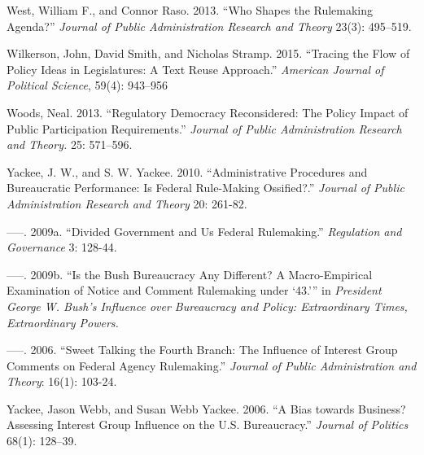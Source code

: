 West, William F., and Connor Raso. 2013. ``Who Shapes the Rulemaking Agenda?'' \textit{Journal of Public Administration Research and Theory} 23(3): 495–519.

Wilkerson, John, David Smith, and Nicholas Stramp. 2015. ``Tracing the Flow of Policy Ideas in Legislatures: A Text Reuse Approach.'' \textit{American Journal of Political Science}, 59(4): 943–956

Woods, Neal. 2013. ``Regulatory Democracy Reconsidered: The Policy Impact of Public Participation Requirements.'' \textit{Journal of Public Administration Research and Theory.} 25: 571–596.



Yackee, J. W., and S. W. Yackee.  2010.  ``Administrative Procedures and Bureaucratic Performance: Is Federal Rule-Making Ossified?.''  \textit{Journal of Public Administration Research and Theory} 20: 261-82.

-----.  2009a. ``Divided Government and Us Federal Rulemaking.''  \textit{Regulation and Governance} 3: 128-44.

-----.  2009b.  ``Is the Bush Bureaucracy Any Different? A Macro-Empirical Examination of Notice and Comment Rulemaking under `43.'''  in \textit{President George W. Bush's Influence over Bureaucracy and Policy: Extraordinary Times, Extraordinary Powers.}

-----. 2006. ``Sweet Talking the Fourth Branch: The Influence of Interest Group Comments on Federal Agency Rulemaking.'' \textit{Journal of Public Administration and Theory}: 16(1): 103-24.

Yackee, Jason Webb, and Susan Webb Yackee. 2006. ``A Bias towards Business? Assessing Interest Group Influence on the U.S. Bureaucracy.'' \textit{Journal of Politics} 68(1): 128–39.








